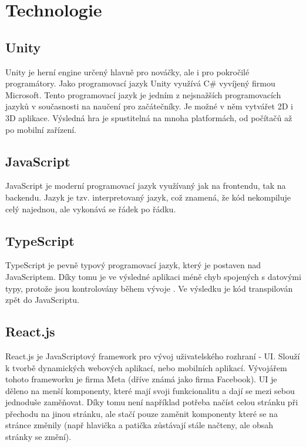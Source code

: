 \section{Technologie}

\subsection{Unity}
Unity je herní engine určený hlavně pro nováčky, ale i pro pokročilé programátory. Jako programovací jazyk Unity využívá C\# vyvíjený firmou Microsoft. Tento programovací jazyk je jedním z nejsnažších programovacích jazyků v současnosti na naučení pro začátečníky. \cite{Csharp} Je možné v něm vytvářet 2D i 3D aplikace. Výsledná hra je spustitelná na mnoha platformách, od počítačů až po mobilní zařízení.

\subsection{JavaScript}
JavaScript je moderní programovací jazyk využívaný jak na frontendu, tak na backendu. Jazyk je tzv. interpretovaný jazyk, což znamená, že kód nekompiluje celý najednou, ale vykonává se řádek po řádku.

\subsection{TypeScript}
TypeScript je pevně typový programovací jazyk, který je postaven nad JavaScriptem. \cite{TypeScript} Díky tomu je ve výsledné aplikaci méně chyb spojených s datovými typy, protože jsou kontrolovány během vývoje \cite{TypeScript}. Ve výsledku je kód transpilován zpět do JavaScriptu.

\subsection{React.js}
React.js je JavaScriptový framework pro vývoj uživatelského rozhraní - UI. Slouží k tvorbě dynamických webových aplikací, nebo mobilních aplikací. Vývojářem tohoto frameworku je firma Meta (dříve známá jako firma Facebook). UI je děleno na menší komponenty, které mají svoji funkcionalitu a dají se mezi sebou jednoduše zaměňovat. Díky tomu není například potřeba načíst celou stránku při přechodu na jinou stránku, ale stačí pouze zaměnit komponenty které se na stránce změnily (např hlavička a patička zůstávají stále načteny, ale obsah stránky se změní).

